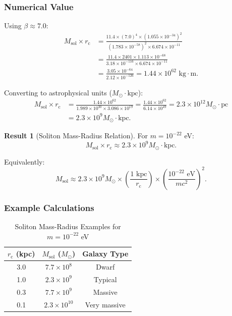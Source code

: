 \documentclass[11pt,a4paper]{article}
\newcommand{\ee}[1]{\times 10^{#1}}
\newcommand{\Msun}{\ensuremath{M_{\odot}}}
\newcommand{\Msol}{\ensuremath{M_{\mathrm{sol}}}}
\newcommand{\rc}{\ensuremath{r_{\mathrm{c}}}}
\theoremstyle{definition}
\newtheorem{result}{Result}
\theoremstyle{remark}
\begin{document}
\subsubsection{Numerical Value}

Using $\beta \approx 7.0$:
\begin{align}
\Msol \times \rc &= \frac{11.4 \times (7.0)^4 \times (1.055 \ee{-34})^2}{(1.783 \ee{-58})^2 \times 6.674 \ee{-11}} \nonumber \\
&= \frac{11.4 \times 2401 \times 1.113 \ee{-68}}{3.18 \ee{-116} \times 6.674 \ee{-11}} \nonumber \\
&= \frac{3.05 \ee{-64}}{2.12 \ee{-126}} = 1.44 \ee{62} \text{ kg} \cdot \text{m}.
\end{align}

Converting to astrophysical units ($\Msun \cdot \text{kpc}$):
\begin{align}
\Msol \times \rc &= \frac{1.44 \ee{62}}{1.989 \ee{30} \times 3.086 \ee{19}} = \frac{1.44 \ee{62}}{6.14 \ee{49}} = 2.3 \ee{12} \Msun \cdot \text{pc} \nonumber \\
&= 2.3 \ee{9} \Msun \cdot \text{kpc}.
\end{align}

\begin{result}[Soliton Mass-Radius Relation]
For $m = 10^{-22}$ eV:
\begin{equation}
\boxed{\Msol \times \rc \approx 2.3 \times 10^9 \Msun \cdot \text{kpc}.}
\end{equation}

Equivalently:
\begin{equation}
\Msol \approx 2.3 \ee{9} \Msun \times \left(\frac{1 \text{ kpc}}{\rc}\right) \times \left(\frac{10^{-22} \text{ eV}}{mc^2}\right)^2.
\end{equation}
\end{result}

\subsubsection{Example Calculations}

\begin{table}[H]
\centering
\caption{Soliton Mass-Radius Examples for $m = 10^{-22}$ eV}
\begin{tabular}{@{}ccc@{}}
\toprule
$\rc$ (kpc) & $\Msol$ ($\Msun$) & Galaxy Type \\
\midrule
3.0 & $7.7 \ee{8}$ & Dwarf \\
1.0 & $2.3 \ee{9}$ & Typical \\
0.3 & $7.7 \ee{9}$ & Massive \\
0.1 & $2.3 \ee{10}$ & Very massive \\
\bottomrule
\end{tabular}
\end{table}
\end{document}
